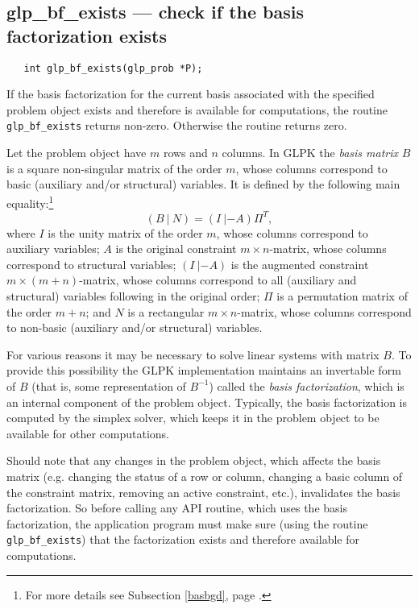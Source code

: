 \subsection{glp\_bf\_exists --- check if the basis factorization
exists}

\synopsis

\begin{verbatim}
   int glp_bf_exists(glp_prob *P);
\end{verbatim}

\returns

If the basis factorization for the current basis associated with the
specified problem object exists and therefore is available for
computations, the routine \verb|glp_bf_exists| returns non-zero.
Otherwise the routine returns zero.


Let the problem object have $m$ rows and $n$ columns. In GLPK the
{\it basis matrix} $B$ is a square non-singular matrix of the order $m$,
whose columns correspond to basic (auxiliary and/or structural)
variables. It is defined by the following main
equality:\footnote{For more details see Subsection \ref{basbgd},
page \pageref{basbgd}.}
$$(B\ |\ N)=(I\ |-\!A)\Pi^T,$$
where $I$ is the unity matrix of the order $m$, whose columns correspond
to auxiliary variables; $A$ is the original constraint
$m\times n$-matrix, whose columns correspond to structural variables;
$(I\ |-\!A)$ is the augmented constraint $m\times(m+n)$-matrix, whose
columns correspond to all (auxiliary and structural) variables
following in the original order; $\Pi$ is a permutation matrix of the
order $m+n$; and $N$ is a rectangular $m\times n$-matrix, whose columns
correspond to non-basic (auxiliary and/or structural) variables.

For various reasons it may be necessary to solve linear systems with
matrix $B$. To provide this possibility the GLPK implementation
maintains an invertable form of $B$ (that is, some representation of
$B^{-1}$) called the {\it basis factorization}, which is an internal
component of the problem object. Typically, the basis factorization is
computed by the simplex solver, which keeps it in the problem object
to be available for other computations.

Should note that any changes in the problem object, which affects the
basis matrix (e.g. changing the status of a row or column, changing
a basic column of the constraint matrix, removing an active constraint,
etc.), invalidates the basis factorization. So before calling any API
routine, which uses the basis factorization, the application program
must make sure (using the routine \verb|glp_bf_exists|) that the
factorization exists and therefore available for computations.

